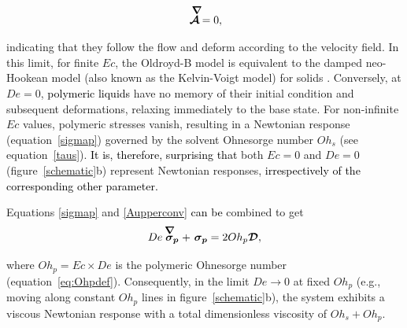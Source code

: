 \documentclass{jfm}
\newcommand{\DL}[1]{{\textcolor{black}{#1}}}
\newcommand{\AO}[1]{{\textcolor{black}{#1}}}
\begin{document}
\begin{align}
	\label{eq:affineMotion}
	\stackrel{\smash{\raisebox{0ex}{$\mkern8mu\boldsymbol{\nabla}$}}}{\boldsymbol{\mathcal{A}}} = 0,
\end{align}

\noindent indicating that they follow the flow and deform according to the velocity field. In this limit, for finite $Ec$, the Oldroyd-B model is equivalent to the damped neo-Hookean model (also known as the Kelvin-Voigt model) for solids \citep{snoeijer2020relationship}.
Conversely, at $De = 0$, \DL{polymeric liquids} have no memory of their initial condition and subsequent deformations, relaxing immediately to the base state. For non-infinite $Ec$ values, polymeric stresses vanish, resulting in a Newtonian response (equation~\eqref{sigmap}) governed by the solvent Ohnesorge number $Oh_s$ (see equation~\eqref{taus}).
\AO{It is, therefore, surprising that} both $Ec = 0$ and $De = 0$ (figure~\ref{schematic}b) represent Newtonian responses, \DL{irrespectively of the corresponding other parameter.}

Equations \eqref{sigmap} and \eqref{Aupperconv} \AO{can be} combined to get

\begin{align}
	\label{oldroydb}
	De\stackrel{\smash{\raisebox{0ex}{$\mkern-8mu\boldsymbol{\nabla}$}}}{\boldsymbol{\sigma_p}} +\,\,\boldsymbol{\sigma_p}
	= 2Oh_p {\boldsymbol{\mathcal{D}}},
\end{align}

\noindent where $Oh_p = Ec \times De$ is the polymeric Ohnesorge number (equation~\eqref{eq:Ohpdef}). Consequently, in the limit $De \to 0$ at fixed $Oh_p$ (e.g., moving along constant $Oh_p$ lines in figure~\ref{schematic}b), the system exhibits a viscous Newtonian response with a total dimensionless viscosity of $Oh_s+Oh_p$.
\end{document}
